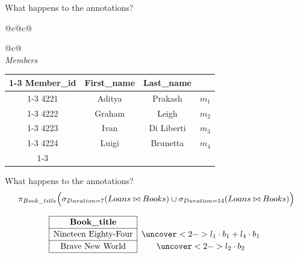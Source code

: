 \documentclass{beamer}
\begin{document}
\begin{frame}[t]{What happens to the annotations?}
{\begin{tabular}{@{}c@{\hspace{1.5cm}}c@{}}
\begin{tabular}{@{}c@{}}
        \\[1.8cm]

        \textit{Members} \\[0.15cm]
        \begin{tabular}{|c|c|c|c}
          \cline{1-3}
          \textbf{Member\_id} & \textbf{First\_name} & \textbf{Last\_name} &       \\ \cline{1-3}
          4221                & Aditya               & Prakash             & $m_1$ \\ \cline{1-3}
          4222                & Graham               & Leigh               & $m_2$ \\ \cline{1-3}
          4223                & Ivan                 & Di Liberti          & $m_3$ \\ \cline{1-3}
          4224                & Luigi                & Brunetta            & $m_4$ \\ \cline{1-3}
        \end{tabular}
      \end{tabular}
    \end{tabular}
  }
\end{frame}

\begin{frame}[t]{What happens to the annotations?}
  \centering
  \[
    \pi_{Book\_title}\Bigl(\sigma_{Duration=7}(Loans \bowtie Books) \cup \sigma_{Duration=14}(Loans \bowtie Books)\Bigr)
  \]

  \[
    \renewcommand{\arraystretch}{1.2}
    \begin{array}{|c|c}
      \cline{1-1}
      \textbf{Book\_title}        &                                             \\ \cline{1-1}
      \text{Nineteen Eighty-Four} & \uncover<2->{l_1 \cdot b_1 + l_4 \cdot b_1} \\ \cline{1-1}
      \text{Brave New World}      & \uncover<2->{l_2 \cdot b_2}                 \\ \cline{1-1}
    \end{array}
  \]
\end{frame}
\end{document}
